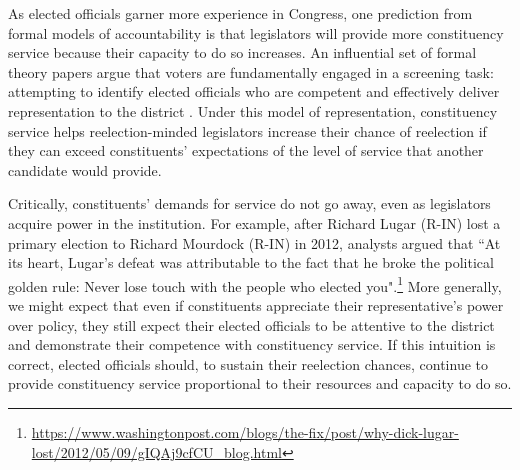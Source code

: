\documentclass[12pt]{article}
\begin{document}

As elected officials garner more experience in Congress, one prediction from formal models of accountability is that legislators will provide more constituency service because their capacity to do so increases. An influential set of formal theory papers argue that voters are fundamentally engaged in a screening task: attempting to identify elected officials who are competent and effectively deliver representation to the district \citep{AshworthBuenodeMesquita2006, gordon2009advantages}. Under this model of representation, constituency service helps reelection-minded legislators increase their chance of reelection if they can exceed constituents' expectations of the level of service that another candidate would provide.  

Critically, constituents' demands for service do not go away, even as legislators acquire power in the institution. For example, after Richard Lugar (R-IN) lost a primary election to Richard Mourdock (R-IN) in 2012, analysts argued that ``At its heart, Lugar's defeat was attributable to the fact that he broke the political golden rule: Never lose touch with the people who elected you".\footnote{\url{https://www.washingtonpost.com/blogs/the-fix/post/why-dick-lugar-lost/2012/05/09/gIQAj9cfCU_blog.html}} %
More generally, we might expect that even if constituents appreciate their representative's power over policy, they still expect their elected officials to be attentive to the district and demonstrate their competence with constituency service. If this intuition is correct, elected officials should, to sustain their reelection chances, continue to provide constituency service proportional to their resources and capacity to do so. %
\end{document}
